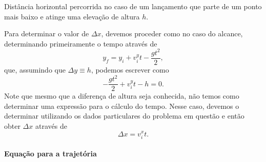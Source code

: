 \begin{marginfigure}[3cm]
\centering
{}
\caption{Distância horizontal percorrida no caso de um lançamento que parte de um ponto mais baixo e atinge uma elevação de altura $h$.}
\end{marginfigure}

Para determinar o valor de $\Delta x$, devemos proceder como no caso do alcance, determinando primeiramente o tempo através de
\begin{equation}
	y_f = y_i + v_{i}^{y}t - \frac{gt^2}{2},
\end{equation}
%
que, assumindo que $\Delta y \equiv h$, podemos escrever como
\begin{equation}
	- \frac{gt^2}{2} + v_{i}^{y}t - h = 0.
\end{equation}
%
Note que mesmo que a diferença de altura seja conhecida, não temos como determinar uma expressão para o cálculo do tempo. Nesse caso, devemos o determinar utilizando os dados particulares do problema em questão e então obter $\Delta x$ através de
\begin{equation}
	\Delta x = v_{i}^{x} t.
\end{equation}

\paragraph{Equação para a trajetória}

